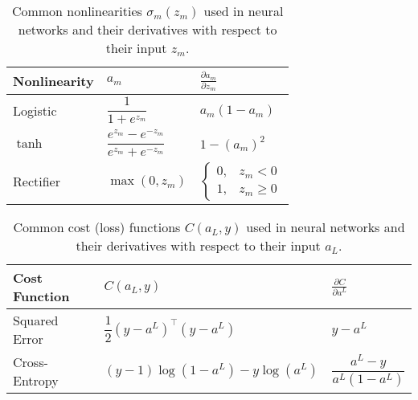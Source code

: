 \begin{table}
\begin{center}
\begin{tabular}{lll}
  \toprule
  Nonlinearity & $a_m$                                            & $\frac{\partial a_m}{\partial z_m}$                   \\
  \midrule
  Logistic     & $\dfrac{1}{1 + e^{z_m}}$                         & $a_m(1 - a_m)$                                        \\[1.2ex]
  $\tanh$      & $\dfrac{e^{z_m} - e^{-z_m}}{e^{z_m} + e^{-z_m}}$ & $1 - (a_m)^2$                                         \\[1.2ex]
  Rectifier    & $\max(0, z_m)$                                   & $\begin{cases}0,& z_m < 0\\ 1,& z_m \ge 0\end{cases}$ \\
  \bottomrule
\end{tabular}
\end{center}
\caption[Common nonlinearities used in neural networks]{Common nonlinearities $\sigma_m(z_m)$ used in neural networks and their derivatives with respect to their input $z_m$.}
  \label{tab:nonlinearities}
\end{table}

\begin{table}
\begin{center}
\begin{tabular}{lll}
  \toprule
  Cost Function & $C(a_L, y)$                           & $\frac{\partial C}{\partial a^L}$ \\
  \midrule
  Squared Error & $\dfrac{1}{2}(y - a^L)^\top(y - a^L)$ & $y - a^L$                         \\
  Cross-Entropy & $(y - 1)\log(1 - a^L) - y\log(a^L)$   & $\dfrac{a^L - y}{a^L(1 - a^L)}$   \\
  \bottomrule
\end{tabular}
\end{center}
\caption[Common cost functions used in neural networks]{Common cost (loss) functions $C(a_L, y)$ used in neural networks and their derivatives with respect to their input $a_L$.}
  \label{tab:cost_functions}
\end{table}

